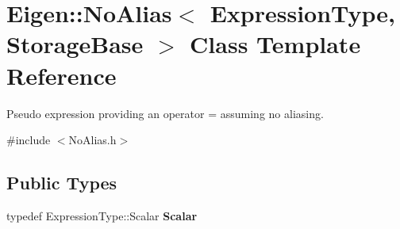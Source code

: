 \hypertarget{class_eigen_1_1_no_alias}{}\section{Eigen\+::No\+Alias$<$ Expression\+Type, Storage\+Base $>$ Class Template Reference}
\label{class_eigen_1_1_no_alias}


Pseudo expression providing an operator = assuming no aliasing.  




{\ttfamily \#include $<$No\+Alias.\+h$>$}

\subsection*{Public Types}
\begin{DoxyCompactItemize}
\item 
\mbox{\label{class_eigen_1_1_no_alias_a21bcfc565d15f2c6010fe7916d0ea7a6}} 
typedef Expression\+Type\+::\+Scalar {\bfseries Scalar}
\end{DoxyCompactItemize}

